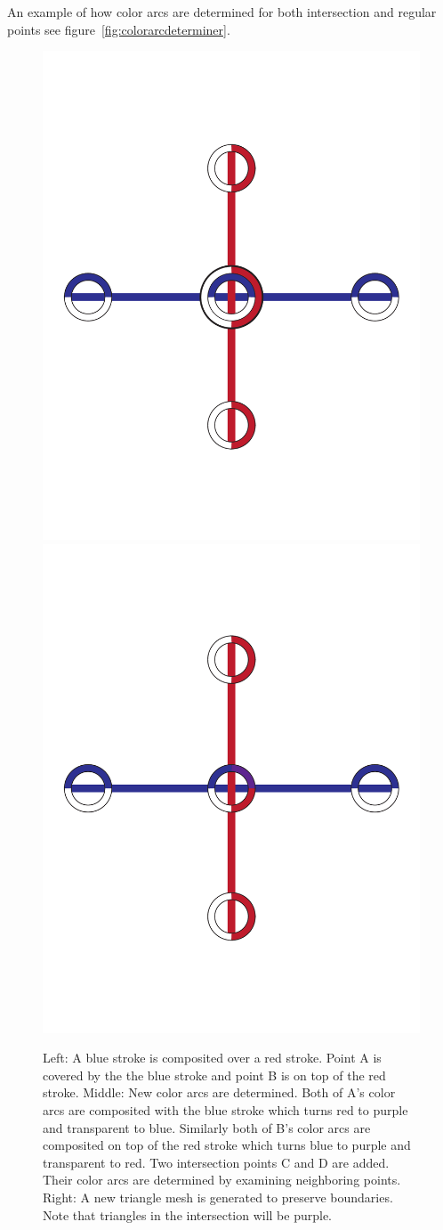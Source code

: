 \documentclass[review]{acmsiggraph}
\begin{document}
An example of how color arcs are determined for both intersection and regular points see figure~\ref{fig:colorarcdeterminer}.

\begin{figure}
    \centering
        \includegraphics[width=.2\textwidth]{images/intersectioncolorarcs1new}
        \includegraphics[width=.2\textwidth]{images/intersectioncolorarcs2new}
        
    \caption{Left: A blue stroke is composited over a red stroke. Point A is covered
             by the the blue stroke and point B is on top of the red stroke. Middle:
             New color arcs are determined. Both of A's color arcs are composited
             with the blue stroke which turns red to purple and transparent to blue. Similarly
             both of B's color arcs are composited on top of the red stroke which turns
             blue to purple and transparent to red. Two intersection points C and D are
             added. Their color arcs are determined by examining neighboring points. Right: 
             A new triangle mesh is generated to preserve boundaries. Note that triangles
             in the intersection will be purple.}
    \label{fig:intersectioncolors}
\end{figure}
\end{document}
